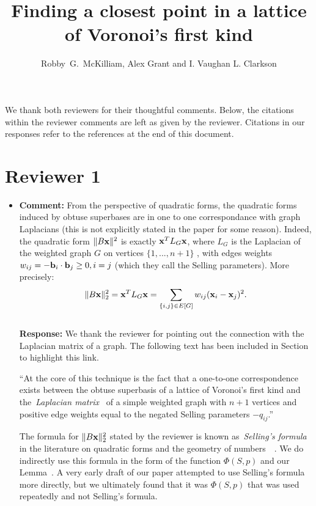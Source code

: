 \documentclass[a4paper,10pt]{article}
\title{Finding a closest point in a lattice of Voronoi's first kind}
\author{Robby~G.~McKilliam, Alex Grant and I. Vaughan L. Clarkson
}
\begin{document}
\maketitle

We thank both reviewers for their thoughtful comments.  Below, the citations within the reviewer comments are left as given by the reviewer.  Citations in our responses refer to the references at the end of this document.


\section*{Reviewer 1}\label{sec:reviewer-1}

\begin{itemize}

\item\textbf{Comment:} 
From the perspective of quadratic forms, the quadratic forms induced by obtuse superbases are in one to one correspondance with graph Laplacians (this is not
explicitly stated in the paper for some reason). Indeed, the quadratic form $\|B\mathbf{x}\|^2$ is exactly $\mathbf{x}^T L_G \mathbf{x}$, where $L_G$ is the Laplacian of the weighted graph $G$ on vertices $\{ 1, . . . , n + 1 \}$ , with edges weights $w_{ij} = -\mathbf{b}_i \cdot \mathbf{b}_j \geq 0, i = j$ (which they call the Selling parameters). More precisely:
\[
\|B\mathbf{x}\|_2^2 = \mathbf{x}^T L_G \mathbf{x} = \sum_{ \{i,j\} \in E[G] } w_{ij} (\mathbf{x}_{i} - \mathbf{x}_{j} )^2.
\]
\\ \textbf{Response:} We thank the reviewer for pointing out the connection with the Laplacian matrix of a graph.  The following text has been included in Section~ to highlight this link.

``At the core of this technique is the fact that a one-to-one correspondence exists between the obtuse superbasis of a lattice of Voronoi's first kind and the~\emph{Laplacian matrix}~\cite{Chung_spectral_graph_theory_1997,Cvetković_spectra_graphs_1998} of a simple weighted graph with $n+1$ vertices and positive edge weights equal to the negated Selling parameters $-q_{ij}$.''

The formula for $\|B\mathbf{x}\|_2^2$ stated by the reviewer is known as~\emph{Selling's formula} in the literature on quadratic forms and the geometry of numbers~\cite[Proposition 2.3.1]{Valentin2003_coverings_tilings_low_dimension}~\cite{Selling1874}.  We do indirectly use this formula in the form of the function $\Phi(S,p)$ and our Lemma~.  A very early draft of our paper attempted to use Selling's formula more directly, but we ultimately found that it was $\Phi(S,p)$ that was used repeatedly and not Selling's formula.


\end{itemize}
\end{document}
